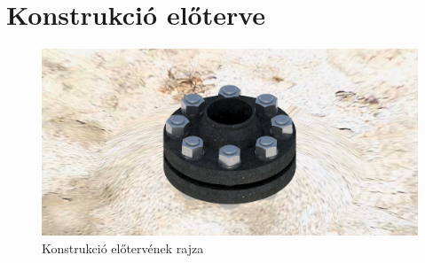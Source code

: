 \section{Konstrukció előterve}


\begin{figure}[hbt!]
	\centering
	\includegraphics[scale=.1]{./images/assembly.png}
	\caption{Konstrukció előtervének rajza}
\end{figure}
